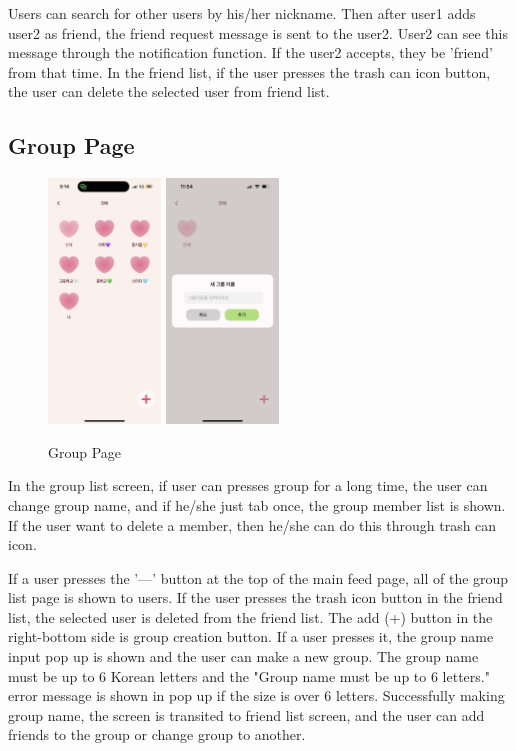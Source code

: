         Users can search for other users by his/her nickname. Then after user1 adds user2 as friend, the friend request message is sent to the user2. User2 can see this message through the notification function. If the user2 accepts, they be 'friend' from that time. In the friend list, if the user presses the trash can icon button, the user can delete the selected user from friend list.

     \subsection{Group Page}
        \begin{figure}[htbp]
            \centerline{
            \includegraphics[width=3cm]{Images/page/group.png}
            \includegraphics[width=3cm]{Images/page/addGroup.jpg}}
             \caption{Group Page}
            \label{fig}
        \end{figure}
        In the group list screen, if user can presses group for a long time, the user can change group name, and if he/she just tab once, the group member list is shown. If the user want to delete a member, then he/she can do this through trash can icon. 

        If a user presses the '—' button at the top of the main feed page, all of the group list page is shown to users. If the user presses the trash icon button in the friend list, the selected user is deleted from the friend list. The add (+) button in the right-bottom side is group creation button. If a user presses it, the group name input pop up is shown and the user can make a new group. The group name must be up to 6 Korean letters and the "Group name must be up to 6 letters." error message is shown in pop up if the size is over 6 letters. Successfully making group name, the screen is transited to friend list screen, and the user can add friends to the group or change group to another.

